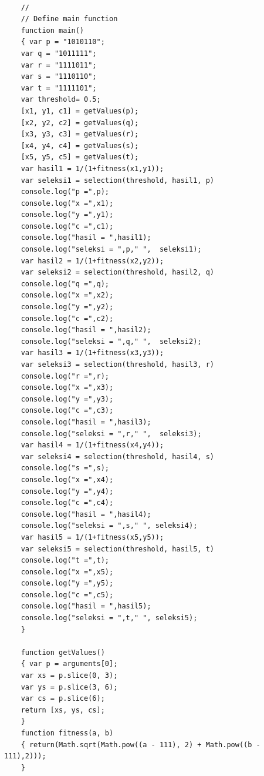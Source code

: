 \documentclass[12pt]{article}
\begin{document}
\begin{enumerate}[label=(\alph*)]
\begin{verbatim}
  	
  	//
  	// Define main function 
  	function main() 
  	{ var p = "1010110";
  	var q = "1011111";
  	var r = "1111011";
  	var s = "1110110";
  	var t = "1111101";
  	var threshold= 0.5;
  	[x1, y1, c1] = getValues(p); 
  	[x2, y2, c2] = getValues(q); 
  	[x3, y3, c3] = getValues(r); 
  	[x4, y4, c4] = getValues(s); 
  	[x5, y5, c5] = getValues(t); 
  	var hasil1 = 1/(1+fitness(x1,y1));
  	var seleksi1 = selection(threshold, hasil1, p)
  	console.log("p =",p); 
  	console.log("x =",x1); 
  	console.log("y =",y1); 
  	console.log("c =",c1);
  	console.log("hasil = ",hasil1);
  	console.log("seleksi = ",p," ",  seleksi1);
  	var hasil2 = 1/(1+fitness(x2,y2));
  	var seleksi2 = selection(threshold, hasil2, q)
  	console.log("q =",q); 
  	console.log("x =",x2); 
  	console.log("y =",y2); 
  	console.log("c =",c2); 
  	console.log("hasil = ",hasil2);
  	console.log("seleksi = ",q," ",  seleksi2);
  	var hasil3 = 1/(1+fitness(x3,y3));
  	var seleksi3 = selection(threshold, hasil3, r)
  	console.log("r =",r); 
  	console.log("x =",x3); 
  	console.log("y =",y3); 
  	console.log("c =",c3); 
  	console.log("hasil = ",hasil3);
  	console.log("seleksi = ",r," ",  seleksi3);
  	var hasil4 = 1/(1+fitness(x4,y4));
  	var seleksi4 = selection(threshold, hasil4, s)
  	console.log("s =",s); 
  	console.log("x =",x4); 
  	console.log("y =",y4); 
  	console.log("c =",c4); 
  	console.log("hasil = ",hasil4);
  	console.log("seleksi = ",s," ", seleksi4);
  	var hasil5 = 1/(1+fitness(x5,y5));
  	var seleksi5 = selection(threshold, hasil5, t)
  	console.log("t =",t); 
  	console.log("x =",x5); 
  	console.log("y =",y5); 
  	console.log("c =",c5); 
  	console.log("hasil = ",hasil5);
  	console.log("seleksi = ",t," ", seleksi5);
  	}
  	
  	function getValues() 
  	{ var p = arguments[0];
  	var xs = p.slice(0, 3); 
  	var ys = p.slice(3, 6); 
  	var cs = p.slice(6);
  	return [xs, ys, cs]; 
  	}
  	function fitness(a, b) 
  	{ return(Math.sqrt(Math.pow((a - 111), 2) + Math.pow((b - 111),2))); 
  	}
  	

\end{verbatim}
\end{enumerate}
\end{document}
